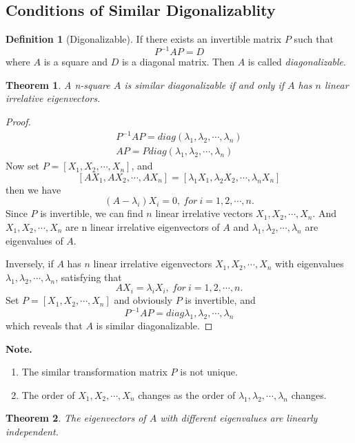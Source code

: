 \documentclass{article}
\newtheorem{theorem}{Theorem}[section]
\theoremstyle{definition}
\newtheorem{defi}{Definition}[section]
\begin{document}
\subsection{Conditions of Similar Digonalizablity}


\begin{defi}[Digonalizable]
    If there exists an invertible matrix $P$ such that
    $$P^{-1}AP=D$$
    where $A$ is a square and $D$ is a diagonal matrix.
    Then $A$ is called \textit{diagonalizable}.
\end{defi}

\begin{theorem}
    A n-square $A$ is similar diagonalizable if and only if $A$ has $n$ linear irrelative eigenvectors.
\end{theorem}

\begin{proof}
\begin{align*}
P^{-1}AP=diag(\lambda_{1},\lambda_{2},\cdots,\lambda_{n})\\
AP=Pdiag(\lambda_{1},\lambda_{2},\cdots,\lambda_{n})
\end{align*}
Now set $P=[X_{1},X_{2},\cdots,X_{n}]$, and 
$$[AX_{1},AX_{2},\cdots,AX_{n}]=[\lambda_{1}X_{1},\lambda_{2}X_{2},\cdots,\lambda_{n}X_{n}]$$
then we have $$(A-\lambda_{i})X_{i}=0,\ for\ i=1,2,\cdots,n.$$
Since $P$ is invertible, we can find $n$ linear irrelative vectors $X_{1},X_{2},\cdots,X_{n}$.
And $X_{1},X_{2},\cdots,X_{n}$ are n linear irrelative eigenvectors of $A$ and $\lambda_{1},\lambda_{2},\cdots,\lambda_{n}$ are 
eigenvalues of $A$.

Inversely, if $A$ has $n$ linear irrelative eigenvectors $X_{1},X_{2},\cdots,X_{n}$ with eigenvalues $\lambda_{1},\lambda_{2},\cdots,\lambda_{n}$,
satisfying that 
$$AX_{i}=\lambda_{i}X_{i},\ for\ i=1,2,\cdots,n.$$
Set $P=[X_{1},X_{2},\cdots,X_{n}]$ and obviously $P$ is invertible, and 
$$P^{-1}AP=diag{\lambda_{1},\lambda_{2},\cdots,\lambda_{n}}$$
which reveals that $A$ is similar diagonalizable.
\end{proof}

\textbf{Note.}
\begin{enumerate}
\item The similar transformation matrix $P$ is not unique.
\item The order of $X_{1},X_{2},\cdots,X_{n}$ changes as the order of $\lambda_{1},\lambda_{2},\cdots,\lambda_{n}$ changes.
\end{enumerate}


\begin{theorem}
The eigenvectors of $A$ with different eigenvalues are linearly independent.
\end{theorem}
\end{document}

